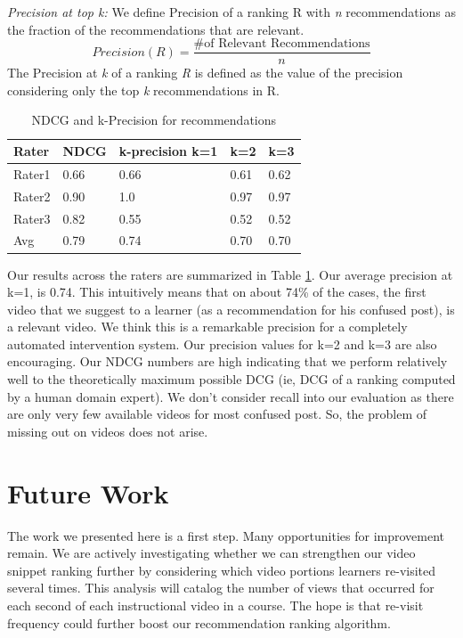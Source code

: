 \documentclass{edm_template}
\begin{document}
\textit{Precision at top k:}
We define Precision of a ranking R with \textit{n} recommendations as the fraction of the recommendations that are relevant.
\begin{equation}
Precision(R) = \frac{\text{\# of Relevant Recommendations}}{n}
\end{equation}
The Precision at \textit{k} of a ranking \textit{R} is defined as the value of the precision considering only the top \textit{k} recommendations in R. 


\begin{table}
    \begin{tabular}{|l|l|l|l|l|}
    \hline
    Rater  & NDCG & k-precision k=1 & k=2  & k=3  \\ \hline
    Rater1 & 0.66 & 0.66            & 0.61 & 0.62 \\ \hline
    Rater2 & 0.90 & 1.0             & 0.97 & 0.97 \\ \hline
    Rater3 & 0.82 & 0.55            & 0.52 & 0.52 \\ \hline
    Avg    & 0.79 & 0.74            & 0.70 & 0.70 \\ \hline
    \end{tabular}
    \caption {NDCG and k-Precision for recommendations}
\label{table:ndcg}
\end{table}

Our results across the raters are summarized in Table \ref{table:ndcg}. Our average precision at k=1, is 0.74. This intuitively means that on about 74\% of the cases, the first video that we suggest to a learner (as a recommendation for his confused post), is a relevant video. We think this is a remarkable precision for a completely automated intervention system. Our precision values for k=2 and k=3 are also encouraging. Our NDCG numbers are high indicating that we perform relatively well to the theoretically maximum possible DCG (ie, DCG of a ranking computed by a human domain expert). We don't consider recall into our evaluation as there are only very few available videos for most confused post. So, the problem of missing out on videos does not arise.

\section{Future Work}
\label{sec:futureWork}

The work we presented here is a first step. Many opportunities for
improvement remain. We are actively investigating whether we can
strengthen our video snippet ranking further by considering which
video portions learners re-visited several times. This analysis will
catalog the number of views that occurred for each second of each
instructional video in a course. The hope is that re-visit frequency
could further boost our recommendation ranking algorithm.
\end{document}
